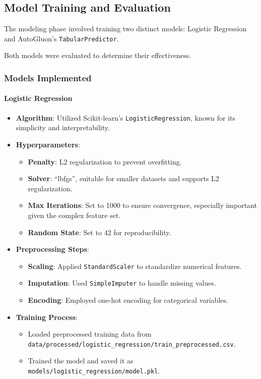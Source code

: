 \documentclass{article}
\begin{document}
\subsection{Model Training and Evaluation}

The modeling phase involved training two distinct models: Logistic Regression and AutoGluon's \texttt{TabularPredictor}.

Both models were evaluated to determine their effectiveness.

\subsubsection{Models Implemented}

\paragraph{Logistic Regression}

\begin{itemize}[leftmargin=*]
    \item \textbf{Algorithm}: Utilized Scikit-learn's \texttt{LogisticRegression}, known for its simplicity and interpretability.
    \item \textbf{Hyperparameters}:
        \begin{itemize}[leftmargin=*]
            \item \textbf{Penalty}: L2 regularization to prevent overfitting.
            \item \textbf{Solver}: ``lbfgs'', suitable for smaller datasets and supports L2 regularization.
            \item \textbf{Max Iterations}: Set to 1000 to ensure convergence, especially important given the complex feature set.
            \item \textbf{Random State}: Set to 42 for reproducibility.
        \end{itemize}
    \item \textbf{Preprocessing Steps}:
        \begin{itemize}[leftmargin=*]
            \item \textbf{Scaling}: Applied \texttt{StandardScaler} to standardize numerical features.
            \item \textbf{Imputation}: Used \texttt{SimpleImputer} to handle missing values.
            \item \textbf{Encoding}: Employed one-hot encoding for categorical variables.
        \end{itemize}
    \item \textbf{Training Process}:
        \begin{itemize}[leftmargin=*]
            \item Loaded preprocessed training data from \texttt{data/processed/logistic\_regression/train\_preprocessed.csv}.
            \item Trained the model and saved it as \texttt{models/logistic\_regression/model.pkl}.
        \end{itemize}
\end{itemize}
\end{document}
